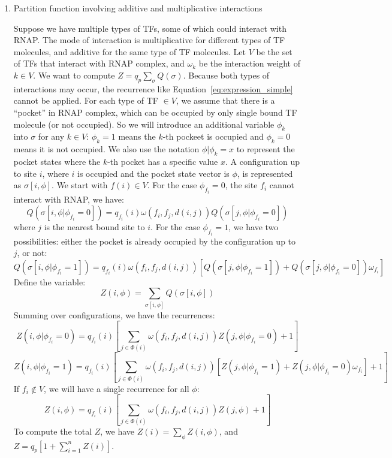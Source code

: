 \documentclass[11pt]{article}
\begin{document}
\begin{enumerate}
\begin{enumerate}
\item{Partition function involving additive and multiplicative interactions}
\label{item:part_func}

Suppose we have multiple types of TFs, some of which could interact with RNAP. The mode of interaction is multiplicative for different types of TF molecules, and additive for the same type of TF molecules. Let $V$ be the set of TFs that interact with RNAP complex, and $\omega_k$ be the interaction weight of $k \in V$. We want to compute $Z = q_p \sum_{\sigma}Q(\sigma)$. Because both types of interactions may occur, the recurrence like Equation~\ref{eq:expression_simple} cannot be applied. For each type of TF $\in V$, we assume that there is a ``pocket'' in RNAP complex, which can be occupied by only single bound TF molecule (or not occupied). So we will introduce an additional variable $\phi_k$ into $\sigma$ for any $k \in V$: $\phi_k = 1$ means the $k$-th pockeet is occupied and $\phi_k = 0$ means it is not occupied. We also use the notation $\phi|\phi_k=x$ to represent the pocket states where the $k$-th pocket has a specific value $x$. A configuration up to site $i$, where $i$ is occupied and the pocket state vector is $\phi$, is represented as $\sigma[i,\phi]$. We start with $f(i) \in V$. For the case $\phi_{f_i} = 0$, the site $f_i$ cannot interact with RNAP, we have: 
\begin{equation}
Q(\sigma[i,\phi|\phi_{f_i}=0]) = q_{f_i}(i) \omega(f_i, f_j, d(i,j)) Q(\sigma[j,\phi|\phi_{f_i}=0])
\end{equation}
where $j$ is the nearest bound site to $i$. For the case $\phi_{f_i} = 1$, we have two possibilities: either the pocket is already occupied by the configuration up to $j$, or not: 
\begin{equation}
Q(\sigma[i,\phi|\phi_{f_i}=1]) = q_{f_i}(i) \omega(f_i, f_j, d(i,j)) \left[ Q(\sigma[j,\phi|\phi_{f_i}=1]) +  Q(\sigma[j,\phi|\phi_{f_i}=0]) \omega_{f_i} \right]
\end{equation}
Define the variable: 
\begin{equation}
Z(i,\phi) = \sum_{\sigma[i,\phi]}Q(\sigma[i,\phi])
\end{equation}
Summing over configurations, we have the recurrences:
\begin{equation}
Z(i,\phi|\phi_{f_i}=0) = q_{f_i}(i) \left[ \sum_{j \in \Phi (i)}\omega(f_i, f_j, d(i,j)) Z(j,\phi|\phi_{f_i}=0) + 1\right]
\end{equation} 
\begin{equation}
Z(i,\phi|\phi_{f_i}=1) = q_{f_i}(i) \left[ \sum_{j \in \Phi (i)} \omega(f_i, f_j, d(i,j)) [Z(j,\phi|\phi_{f_i}=1) +  Z(j,\phi|\phi_{f_i}=0) \omega_{f_i}] + 1 \right]
\end{equation}
If $f_i \notin V$, we will have a single recurrence for all $\phi$: 
\begin{equation}
Z(i,\phi) = q_{f_i}(i) \left[ \sum_{j \in \Phi (i)}\omega(f_i, f_j, d(i,j)) Z(j,\phi) + 1\right]
\end{equation}
To compute the total $Z$, we have $Z(i) = \sum_{\phi}Z(i,\phi)$, and $Z = q_p [1 + \sum_{i=1}^{n}Z(i)]$.
 

\end{enumerate}
\end{enumerate}
\end{document}
